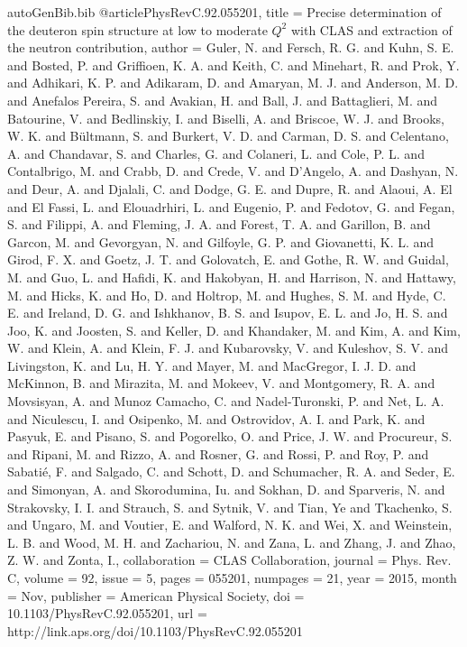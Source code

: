 \begin{filecontents*}{autoGenBib.bib}
@article{PhysRevC.92.055201,
  title = {Precise determination of the deuteron spin structure at low to moderate ${Q}^{2}$ with CLAS and extraction of the neutron contribution},
  author = {Guler, N. and Fersch, R. G. and Kuhn, S. E. and Bosted, P. and Griffioen, K. A. and Keith, C. and Minehart, R. and Prok, Y. and Adhikari, K. P. and Adikaram, D. and Amaryan, M. J. and Anderson, M. D. and Anefalos Pereira, S. and Avakian, H. and Ball, J. and Battaglieri, M. and Batourine, V. and Bedlinskiy, I. and Biselli, A. and Briscoe, W. J. and Brooks, W. K. and B\"ultmann, S. and Burkert, V. D. and Carman, D. S. and Celentano, A. and Chandavar, S. and Charles, G. and Colaneri, L. and Cole, P. L. and Contalbrigo, M. and Crabb, D. and Crede, V. and D'Angelo, A. and Dashyan, N. and Deur, A. and Djalali, C. and Dodge, G. E. and Dupre, R. and Alaoui, A. El and El Fassi, L. and Elouadrhiri, L. and Eugenio, P. and Fedotov, G. and Fegan, S. and Filippi, A. and Fleming, J. A. and Forest, T. A. and Garillon, B. and Garcon, M. and Gevorgyan, N. and Gilfoyle, G. P. and Giovanetti, K. L. and Girod, F. X. and Goetz, J. T. and Golovatch, E. and Gothe, R. W. and Guidal, M. and Guo, L. and Hafidi, K. and Hakobyan, H. and Harrison, N. and Hattawy, M. and Hicks, K. and Ho, D. and Holtrop, M. and Hughes, S. M. and Hyde, C. E. and Ireland, D. G. and Ishkhanov, B. S. and Isupov, E. L. and Jo, H. S. and Joo, K. and Joosten, S. and Keller, D. and Khandaker, M. and Kim, A. and Kim, W. and Klein, A. and Klein, F. J. and Kubarovsky, V. and Kuleshov, S. V. and Livingston, K. and Lu, H. Y. and Mayer, M. and MacGregor, I. J. D. and McKinnon, B. and Mirazita, M. and Mokeev, V. and Montgomery, R. A. and Movsisyan, A. and Munoz Camacho, C. and Nadel-Turonski, P. and Net, L. A. and Niculescu, I. and Osipenko, M. and Ostrovidov, A. I. and Park, K. and Pasyuk, E. and Pisano, S. and Pogorelko, O. and Price, J. W. and Procureur, S. and Ripani, M. and Rizzo, A. and Rosner, G. and Rossi, P. and Roy, P. and Sabati\'e, F. and Salgado, C. and Schott, D. and Schumacher, R. A. and Seder, E. and Simonyan, A. and Skorodumina, Iu. and Sokhan, D. and Sparveris, N. and Strakovsky, I. I. and Strauch, S. and Sytnik, V. and Tian, Ye and Tkachenko, S. and Ungaro, M. and Voutier, E. and Walford, N. K. and Wei, X. and Weinstein, L. B. and Wood, M. H. and Zachariou, N. and Zana, L. and Zhang, J. and Zhao, Z. W. and Zonta, I.},
  collaboration = {CLAS Collaboration},
  journal = {Phys. Rev. C},
  volume = {92},
  issue = {5},
  pages = {055201},
  numpages = {21},
  year = {2015},
  month = {Nov},
  publisher = {American Physical Society},
  doi = {10.1103/PhysRevC.92.055201},
  url = {http://link.aps.org/doi/10.1103/PhysRevC.92.055201}
}



\end{filecontents*}
